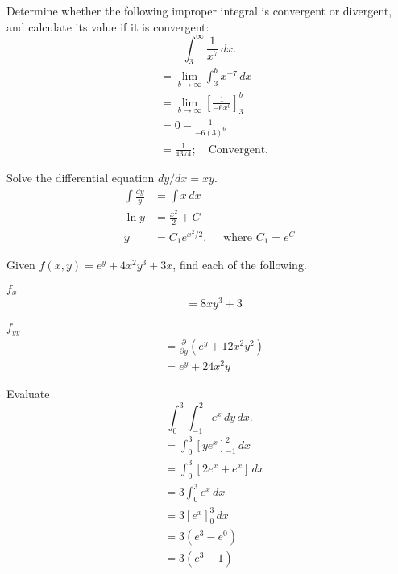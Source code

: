 \documentclass[12pt]{article}
\newenvironment{problem}[2][]{
    \begin{trivlist}
        \item[
            {\bfseries #1}
            {\bfseries #2.}
        ]
}{\end{trivlist}}
\newcommand{\Problem}[1]{\bigskip \noindent #1}
\newcommand{\dx}{\, dx}
\newcommand{\dy}{\, dy}
\begin{document}
\begin{problem}{47}
    Determine whether the following improper integral is convergent or divergent, and calculate its value if it is convergent: $$\int_3^\infty \frac{1}{x^7} \dx.$$
    \begin{align}
        &= \underset{b \to \infty}{\lim} \int_3^b x^{-7} \dx \\
        &= \underset{b \to \infty}{\lim} \left[\frac{1}{-6x^6}\right]_3^b \\
        &= 0 - \frac{1}{-6\left(3\right)^6} \\
        &= \frac{1}{4374}; \quad \text{Convergent.}
    \end{align}
\end{problem}

\begin{problem}{52}
    Solve the differential equation $dy/dx = xy$.
    \begin{align}
        \int \frac{dy}{y} &= \int x \dx \\
        \ln y &= \frac{x^2}{2} + C \\
        y &= C_1e^{x^2/2}, \quad \text{ where } C_1 = e^C
    \end{align}
\end{problem}

\Problem{Given $f(x,y) = e^y + 4x^2y^3 + 3x$, find each of the following.}

\begin{problem}{54}
    $f_x$
    \begin{align}
        &= 8xy^3 + 3
    \end{align}
\end{problem}

\begin{problem}{55}
    $f_{yy}$
    \begin{align}
        &= \frac{\partial}{\partial y} \left(e^y + 12x^2y^2\right) \\
        &= e^y + 24x^2y
    \end{align}
\end{problem}

\begin{problem}{58}
    Evaluate $$\int_0^3 \int_{-1}^2 e^x \dy \dx.$$
    \begin{align}
        &= \int_0^3 \left[ye^x\right]_{-1}^2 \dx \\
        &= \int_0^3 \left[2e^x + e^x\right] \dx \\
        &= 3 \int_0^3 e^x \dx \\
        &= 3 \left[e^x\right]_0^3 \dx \\
        &= 3 \left(e^3 - e^0\right) \\
        &= 3 \left(e^3 - 1\right)
    \end{align}
\end{problem}
\end{document}
